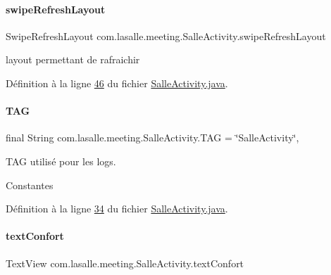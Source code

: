 \paragraph{\texorpdfstring{swipe\+Refresh\+Layout}{swipeRefreshLayout}}
{\footnotesize\ttfamily Swipe\+Refresh\+Layout com.\+lasalle.\+meeting.\+Salle\+Activity.\+swipe\+Refresh\+Layout\hspace{0.3cm}{\ttfamily [private]}}



layout permettant de rafraichir 



Définition à la ligne \hyperlink{_salle_activity_8java_source_l00046}{46} du fichier \hyperlink{_salle_activity_8java_source}{Salle\+Activity.\+java}.

\mbox{\label{classcom_1_1lasalle_1_1meeting_1_1_salle_activity_a70adba176c2984edf5ae1b188017ac25}} 
\paragraph{\texorpdfstring{T\+AG}{TAG}}
{\footnotesize\ttfamily final String com.\+lasalle.\+meeting.\+Salle\+Activity.\+T\+AG = \char`\"{}Salle\+Activity\char`\"{}\hspace{0.3cm}{\ttfamily [static]}, {\ttfamily [private]}}



T\+AG utilisé pour les logs. 

Constantes 

Définition à la ligne \hyperlink{_salle_activity_8java_source_l00034}{34} du fichier \hyperlink{_salle_activity_8java_source}{Salle\+Activity.\+java}.

\mbox{\label{classcom_1_1lasalle_1_1meeting_1_1_salle_activity_a9b647a7aaf2aab7a9e74cb525c250545}} 
\paragraph{\texorpdfstring{text\+Confort}{textConfort}}
{\footnotesize\ttfamily Text\+View com.\+lasalle.\+meeting.\+Salle\+Activity.\+text\+Confort\hspace{0.3cm}{\ttfamily [private]}}



